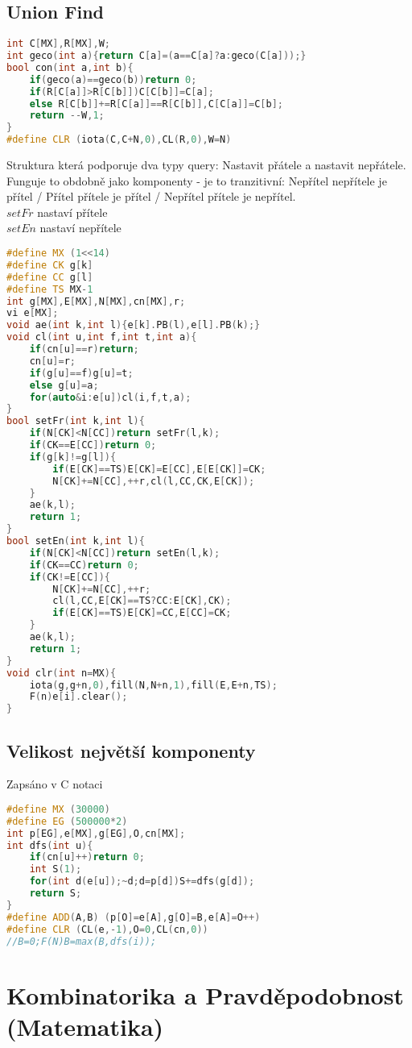 \documentclass[11pt]{article}
\begin{document}
\subsection{Union Find}
\begin{lstlisting}[language=C++]
int C[MX],R[MX],W;
int geco(int a){return C[a]=(a==C[a]?a:geco(C[a]));}
bool con(int a,int b){
    if(geco(a)==geco(b))return 0;
    if(R[C[a]]>R[C[b]])C[C[b]]=C[a];
    else R[C[b]]+=R[C[a]]==R[C[b]],C[C[a]]=C[b];
    return --W,1;
}
#define CLR (iota(C,C+N,0),CL(R,0),W=N)
\end{lstlisting}
Struktura která podporuje dva typy query: Nastavit přátele a nastavit nepřátele.
\\Funguje to obdobně jako komponenty - je to tranzitivní: Nepřítel nepřítele je přítel / Přítel přítele je přítel / Nepřítel přítele je nepřítel.
\\$setFr$ nastaví přítele
\\$setEn$ nastaví nepřítele
\begin{lstlisting}[language=C++]
#define MX (1<<14)
#define CK g[k]
#define CC g[l]
#define TS MX-1
int g[MX],E[MX],N[MX],cn[MX],r;
vi e[MX];
void ae(int k,int l){e[k].PB(l),e[l].PB(k);}
void cl(int u,int f,int t,int a){
    if(cn[u]==r)return;
    cn[u]=r;
    if(g[u]==f)g[u]=t;
    else g[u]=a;
    for(auto&i:e[u])cl(i,f,t,a);
}
bool setFr(int k,int l){
    if(N[CK]<N[CC])return setFr(l,k);
    if(CK==E[CC])return 0;
    if(g[k]!=g[l]){
        if(E[CK]==TS)E[CK]=E[CC],E[E[CK]]=CK;
        N[CK]+=N[CC],++r,cl(l,CC,CK,E[CK]);
    }
    ae(k,l);
    return 1;
}
bool setEn(int k,int l){
    if(N[CK]<N[CC])return setEn(l,k);
    if(CK==CC)return 0;
    if(CK!=E[CC]){
        N[CK]+=N[CC],++r;
        cl(l,CC,E[CK]==TS?CC:E[CK],CK);
        if(E[CK]==TS)E[CK]=CC,E[CC]=CK;
    }
    ae(k,l);
    return 1;
}
void clr(int n=MX){
    iota(g,g+n,0),fill(N,N+n,1),fill(E,E+n,TS);
    F(n)e[i].clear();
}
\end{lstlisting}
\subsection{Velikost největší komponenty}
Zapsáno v \textsf{C} notaci
\begin{lstlisting}[language=C++]
#define MX (30000)
#define EG (500000*2)
int p[EG],e[MX],g[EG],O,cn[MX];
int dfs(int u){
    if(cn[u]++)return 0;
    int S(1);
    for(int d(e[u]);~d;d=p[d])S+=dfs(g[d]);
    return S;
}
#define ADD(A,B) (p[O]=e[A],g[O]=B,e[A]=O++)
#define CLR (CL(e,-1),O=0,CL(cn,0))
//B=0;F(N)B=max(B,dfs(i));
\end{lstlisting}
\newpage\section{Kombinatorika a Pravděpodobnost (Matematika)}
\end{document}

